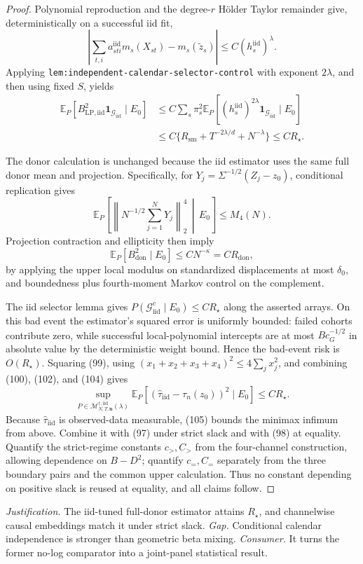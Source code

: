 \documentclass{article}
\begin{document}
\begin{proof}
Polynomial reproduction and the degree-\(r\) H\"older Taylor remainder give, deterministically on a successful iid fit,
\[
\left|\sum_{t,i}a_{sti}^{\mathrm{iid}}m_s(X_{st})
-m_s(\widetilde z_s)\right|
\leq C(h_s^{\mathrm{iid}})^\lambda.
\tag{101}
\]
Applying \texttt{lem:independent-calendar-selector-control} with exponent \(2\lambda\), and then using fixed \(S\), yields
\[
\begin{aligned}
\mathbb E_P[B_{\mathrm{LP,iid}}^2\mathbf1_{\mathcal G_{\mathrm{iid}}}\mid E_0]
&\leq C\sum_s\pi_s^2
\mathbb E_P[(h_s^{\mathrm{iid}})^{2\lambda}
\mathbf1_{\mathcal G_{\mathrm{iid}}}\mid E_0]\\
&\leq C\{R_{\mathrm{sm}}+T^{-2\lambda/d}+N^{-\lambda}\}
\leq CR_\star.
\end{aligned}
\tag{102}
\]

The donor calculation is unchanged because the iid estimator uses the same full donor mean and projection.  Specifically, for
\(Y_j=\Sigma^{-1/2}(Z_j-z_0)\), conditional replication gives
\[
\mathbb E_P\!\left[
\left\|N^{-1/2}\sum_{j=1}^{N}Y_j\right\|_2^4
\,\middle|\,E_0\right]
\leq M_4(N).
\tag{103}
\]
Projection contraction and ellipticity then imply
\[
\mathbb E_P[B_{\mathrm{don}}^2\mid E_0]
\leq CN^{-\kappa}=CR_{\mathrm{don}},
\tag{104}
\]
by applying the upper local modulus on standardized displacements at most \(\delta_0\), and boundedness plus fourth-moment Markov control on the complement.

The iid selector lemma gives
\(P(\mathcal G_{\mathrm{iid}}^c\mid E_0)\leq CR_\star\) along the asserted arrays.  On this bad event the estimator's squared error is uniformly bounded: failed cohorts contribute zero, while successful local-polynomial intercepts are at most \(Bc_G^{-1/2}\) in absolute value by the deterministic weight bound.  Hence the bad-event risk is \(O(R_\star)\).  Squaring (99), using
\((x_1+x_2+x_3+x_4)^2\leq4\sum_jx_j^2\), and combining (100), (102), and (104) gives
\[
\sup_{P\in\mathcal M_{N,T,\mathbf n}^{\dagger,\mathrm{iid}}(\lambda)}
\mathbb E_P[(\widehat\tau_{\mathrm{iid}}-\tau_n(z_0))^2\mid E_0]
\leq CR_\star.
\tag{105}
\]
Because \(\widehat\tau_{\mathrm{iid}}\) is observed-data measurable, (105) bounds the minimax infimum from above.  Combine it with (97) under strict slack and with (98) at equality.  Quantify the strict-regime constants \(c_{>},C_{>}\) from the four-channel construction, allowing dependence on \(B-D^2\); quantify \(c_{=},C_{=}\) separately from the three boundary pairs and the common upper calculation.  Thus no constant depending on positive slack is reused at equality, and all claims follow.
\end{proof}
\par\smallskip\noindent \textit{Justification.} The iid-tuned full-donor estimator attains \(R_\star\), and channelwise causal embeddings match it under strict slack. \textit{Gap.} Conditional calendar independence is stronger than geometric beta mixing. \textit{Consumer.} It turns the former no-log comparator into a joint-panel statistical result.
\end{document}
